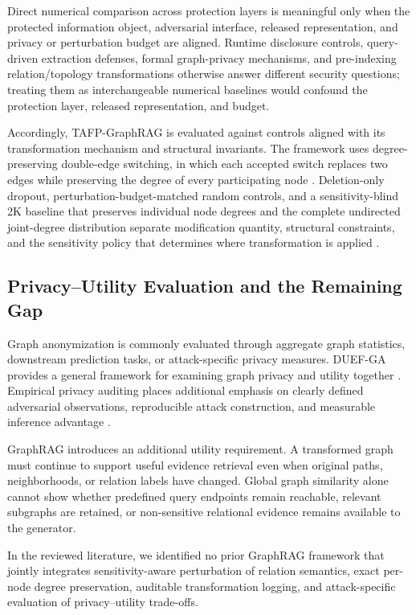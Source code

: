 \documentclass[preprint,12pt]{elsarticle}
\begin{document}
Direct numerical comparison across protection layers is meaningful only when the protected information object, adversarial interface, released representation, and privacy or perturbation budget are aligned. Runtime disclosure controls, query-driven extraction defenses, formal graph-privacy mechanisms, and pre-indexing relation/topology transformations otherwise answer different security questions; treating them as interchangeable numerical baselines would confound the protection layer, released representation, and budget.

Accordingly, TAFP-GraphRAG is evaluated against controls aligned with its transformation mechanism and structural invariants. The framework uses degree-preserving double-edge switching, in which each accepted switch replaces two edges while preserving the degree of every participating node \cite{ref24_mannion_2024}. Deletion-only dropout, perturbation-budget-matched random controls, and a sensitivity-blind 2K baseline that preserves individual node degrees and the complete undirected joint-degree distribution separate modification quantity, structural constraints, and the sensitivity policy that determines where transformation is applied \cite{ref26_mortazavi_2020,ref36_xiang_2022}.

\subsection{Privacy--Utility Evaluation and the Remaining Gap}
Graph anonymization is commonly evaluated through aggregate graph statistics, downstream prediction tasks, or attack-specific privacy measures. DUEF-GA provides a general framework for examining graph privacy and utility together \cite{ref03_casas_roma_2020}. Empirical privacy auditing places additional emphasis on clearly defined adversarial observations, reproducible attack construction, and measurable inference advantage \cite{ref02_annamalai_2024,ref37_xiang_2025}.

GraphRAG introduces an additional utility requirement. A transformed graph must continue to support useful evidence retrieval even when original paths, neighborhoods, or relation labels have changed. Global graph similarity alone cannot show whether predefined query endpoints remain reachable, relevant subgraphs are retained, or non-sensitive relational evidence remains available to the generator.

In the reviewed literature, we identified no prior GraphRAG framework that jointly integrates sensitivity-aware perturbation of relation semantics, exact per-node degree preservation, auditable transformation logging, and attack-specific evaluation of privacy--utility trade-offs.
\end{document}
